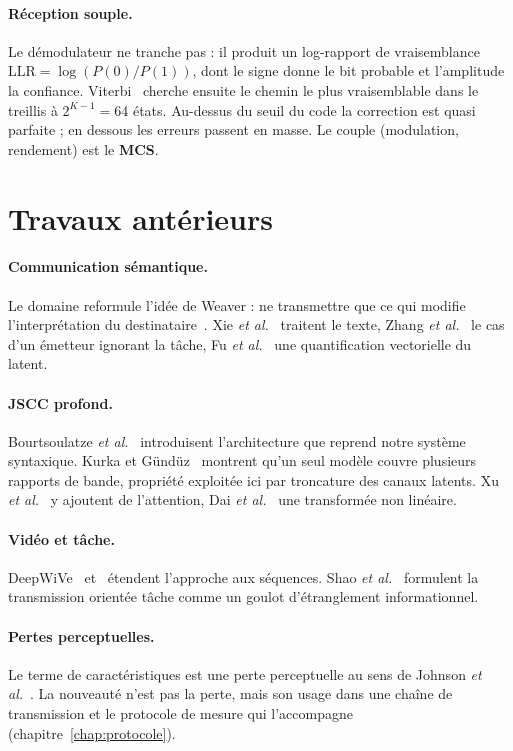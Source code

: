 \paragraph{Réception souple.} Le démodulateur ne tranche pas : il produit un log-rapport de vraisemblance
$\mathrm{LLR} = \log(P(0)/P(1))$, dont le signe donne le bit probable et l'amplitude la confiance.
Viterbi~\cite{viterbi1967} cherche ensuite le chemin le plus vraisemblable dans le treillis à $2^{K-1}=64$
états. Au-dessus du seuil du code la correction est quasi parfaite ; en dessous les erreurs passent en masse.
Le couple (modulation, rendement) est le \textbf{MCS}.

\section{Travaux antérieurs}
\label{sec:etat_art}

\paragraph{Communication sémantique.} Le domaine reformule l'idée de Weaver : ne transmettre que ce qui
modifie l'interprétation du destinataire~\cite{qin2021,gunduz2023}. Xie \emph{et al.}~\cite{xie2021} traitent
le texte, Zhang \emph{et al.}~\cite{zhang2023} le cas d'un émetteur ignorant la tâche, Fu
\emph{et al.}~\cite{fu2023} une quantification vectorielle du latent.

\paragraph{JSCC profond.} Bourtsoulatze \emph{et al.}~\cite{bourtsoulatze2019} introduisent l'architecture que
reprend notre système syntaxique. Kurka et Gündüz~\cite{kurka2021} montrent qu'un seul modèle couvre plusieurs
rapports de bande, propriété exploitée ici par troncature des canaux latents. Xu \emph{et
al.}~\cite{xu2022} y ajoutent de l'attention, Dai \emph{et al.}~\cite{dai2022} une transformée non linéaire.

\paragraph{Vidéo et tâche.} DeepWiVe~\cite{tung2022} et~\cite{wang2023} étendent l'approche aux séquences.
Shao \emph{et al.}~\cite{shao2022} formulent la transmission orientée tâche comme un goulot d'étranglement
informationnel.

\paragraph{Pertes perceptuelles.} Le terme de caractéristiques est une perte perceptuelle au sens de Johnson
\emph{et al.}~\cite{johnson2016}. La nouveauté n'est pas la perte, mais son usage dans une chaîne de
transmission et le protocole de mesure qui l'accompagne (chapitre~\ref{chap:protocole}).


